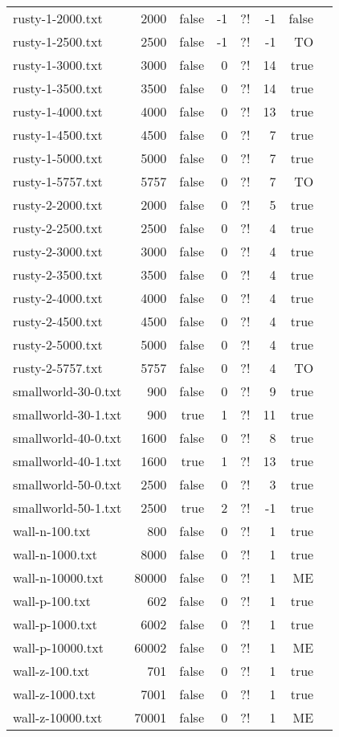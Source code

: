 \begin{tabular}{lrrrrrrr}
  rusty-1-2000.txt & 2000 & false & -1 & ?! & -1 & false \\
  rusty-1-2500.txt & 2500 & false & -1 & ?! & -1 & TO \\
  rusty-1-3000.txt & 3000 & false & 0 & ?! & 14 & true \\
  rusty-1-3500.txt & 3500 & false & 0 & ?! & 14 & true \\
  rusty-1-4000.txt & 4000 & false & 0 & ?! & 13 & true \\
  rusty-1-4500.txt & 4500 & false & 0 & ?! & 7 & true \\
  rusty-1-5000.txt & 5000 & false & 0 & ?! & 7 & true \\
  rusty-1-5757.txt & 5757 & false & 0 & ?! & 7 & TO \\
  rusty-2-2000.txt & 2000 & false & 0 & ?! & 5 & true \\
  rusty-2-2500.txt & 2500 & false & 0 & ?! & 4 & true \\
  rusty-2-3000.txt & 3000 & false & 0 & ?! & 4 & true \\
  rusty-2-3500.txt & 3500 & false & 0 & ?! & 4 & true \\
  rusty-2-4000.txt & 4000 & false & 0 & ?! & 4 & true \\
  rusty-2-4500.txt & 4500 & false & 0 & ?! & 4 & true \\
  rusty-2-5000.txt & 5000 & false & 0 & ?! & 4 & true \\
  rusty-2-5757.txt & 5757 & false & 0 & ?! & 4 & TO \\
  smallworld-30-0.txt & 900 & false & 0 & ?! & 9 & true \\
  smallworld-30-1.txt & 900 & true & 1 & ?! & 11 & true \\
  smallworld-40-0.txt & 1600 & false & 0 & ?! & 8 & true \\
  smallworld-40-1.txt & 1600 & true & 1 & ?! & 13 & true \\
  smallworld-50-0.txt & 2500 & false & 0 & ?! & 3 & true \\
  smallworld-50-1.txt & 2500 & true & 2 & ?! & -1 & true \\
  wall-n-100.txt & 800 & false & 0 & ?! & 1 & true \\
  wall-n-1000.txt & 8000 & false & 0 & ?! & 1 & true \\
  wall-n-10000.txt & 80000 & false & 0 & ?! & 1 & ME \\
  wall-p-100.txt & 602 & false & 0 & ?! & 1 & true \\
  wall-p-1000.txt & 6002 & false & 0 & ?! & 1 & true \\
  wall-p-10000.txt & 60002 & false & 0 & ?! & 1 & ME \\
  wall-z-100.txt & 701 & false & 0 & ?! & 1 & true \\
  wall-z-1000.txt & 7001 & false & 0 & ?! & 1 & true \\
  wall-z-10000.txt & 70001 & false & 0 & ?! & 1 & ME \\
  \bottomrule
\end{tabular}
\medskip